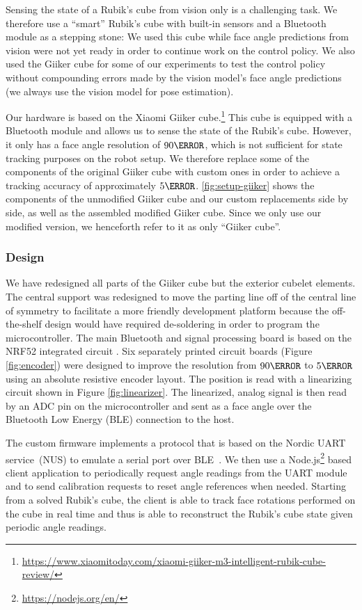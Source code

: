 Sensing the state of a Rubik's cube from vision only is a challenging task. We therefore use a ``smart'' Rubik's cube with built-in sensors and a Bluetooth module as a stepping stone: We used this cube while face angle predictions from vision were not yet ready in order to continue work on the control policy. We also used the Giiker cube for some of our experiments to test the control policy without compounding errors made by the vision model's face angle predictions (we always use the vision model for pose estimation).

Our hardware is based on the Xiaomi Giiker cube.\footnote{\url{https://www.xiaomitoday.com/xiaomi-giiker-m3-intelligent-rubik-cube-review/}} This cube is equipped with a Bluetooth module and allows us to sense the state of the Rubik's cube. However, it only has a face angle resolution of $90\degree$, which is not sufficient for state tracking purposes on the robot setup. We therefore replace some of the components of the original Giiker cube with custom ones in order to achieve a tracking accuracy of approximately $5\degree$. \autoref{fig:setup-giiker} shows the components of the unmodified Giiker cube and our custom replacements side by side, as well as the assembled modified Giiker cube. Since we only use our modified version, we henceforth refer to it as only ``Giiker cube''.

\subsubsection{Design}

We have redesigned all parts of the Giiker cube but the exterior cubelet elements. The central support was redesigned to move the parting line off of the central line of symmetry to facilitate a more friendly development platform because the off-the-shelf design would have required de-soldering in order to program the microcontroller. The main Bluetooth and signal processing board is based on the NRF52 integrated circuit \cite{nordic}. Six separately printed circuit boards (Figure \ref{fig:encoder}) were designed to improve the resolution from $90\degree$ to $5 \degree$ using an absolute resistive encoder layout. The position is read with a linearizing circuit shown in Figure \ref{fig:linearizer}. The linearized, analog signal is then read by an ADC pin on the microcontroller and sent as a face angle over the Bluetooth Low Energy (BLE) connection to the host.


The custom firmware implements a protocol that is based on the Nordic UART service~(NUS) to emulate a serial port over BLE~\cite{nordic}. We then use a Node.js\footnote{\url{https://nodejs.org/en/}} based client application to periodically request angle readings from the UART module and to send calibration requests to reset angle references when needed. Starting from a solved Rubik's cube, the client is able to track face rotations performed on the cube in real time and thus is able to reconstruct the Rubik's cube state given periodic angle readings. 

